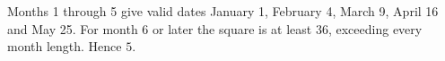 Months 1 through 5 give valid dates January 1, February 4, March 9, April 16 and May 25. For month 6 or later the square is at least 36, exceeding every month length. Hence $\boxed5$.
